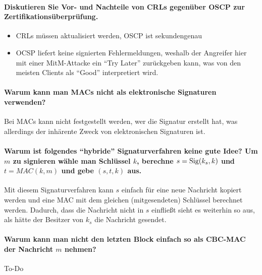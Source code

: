 \paragraph{Diskutieren Sie Vor- und Nachteile von CRLs gegenüber OSCP zur Zertifikationsüberprüfung.}
\begin{itemize}
	\item CRLs müssen aktualisiert werden, OSCP ist sekundengenau
	\item OCSP liefert keine signierten Fehlermeldungen, weshalb der Angreifer hier mit einer MitM-Attacke ein \enquote{Try Later} zurückgeben kann, was von den meisten Clients als \enquote{Good} interpretiert wird.
\end{itemize}

\paragraph{Warum kann man MACs nicht als elektronische Signaturen verwenden?}
Bei MACs kann nicht festgestellt werden, wer die Signatur erstellt hat, was allerdings der inhärente Zweck von elektronischen Signaturen ist.

\paragraph{Warum ist folgendes \enquote{hybride} Signaturverfahren keine gute Idee? Um \(m\) zu signieren wähle man Schlüssel \(k\), berechne \(s = \operatorname{Sig}(k_s, k) \) und \(t = MAC(k, m)\) und gebe \((s, t, k)\) aus.}
	Mit diesem Signaturverfahren kann \(s\) einfach für eine neue Nachricht kopiert werden und eine MAC mit dem gleichen (mitgesendeten) Schlüssel berechnet werden. Dadurch, dass die Nachricht nicht in \(s\) einfließt sieht es weiterhin so aus, als hätte der Besitzer von \(k_s\) die Nachricht gesendet.

	\paragraph{Warum kann man nicht den letzten Block einfach so als CBC-MAC der Nachricht \(m\) nehmen?}
		To-Do 

